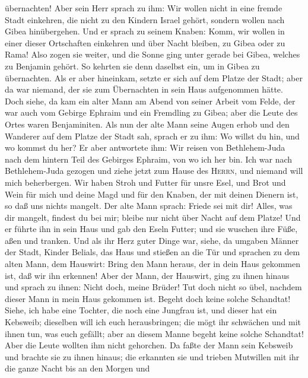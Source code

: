 übernachten!  Aber sein Herr sprach zu ihm: Wir wollen
nicht in eine fremde Stadt einkehren, die nicht zu den Kindern Israel
gehört, sondern wollen nach Gibea hinübergehen.  Und er
sprach zu seinem Knaben: Komm, wir wollen in einer dieser Ortschaften
einkehren und über Nacht bleiben, zu Gibea oder zu Rama! 
Also zogen sie weiter, und die Sonne ging unter gerade bei Gibea,
welches zu Benjamin gehört.  So kehrten sie denn daselbst
ein, um in Gibea zu übernachten. Als er aber hineinkam, setzte er sich
auf dem Platze der Stadt; aber da war niemand, der sie zum Übernachten
in sein Haus aufgenommen hätte.  Doch siehe, da kam ein
alter Mann am Abend von seiner Arbeit vom Felde, der war auch vom
Gebirge Ephraim und ein Fremdling zu Gibea; aber die Leute des Ortes
waren Benjaminiten.  Als nun der alte Mann seine Augen
erhob und den Wanderer auf dem Platze der Stadt sah, sprach er zu ihm:
Wo willst du hin, und wo kommst du her?  Er aber
antwortete ihm: Wir reisen von Bethlehem-Juda nach dem hintern Teil des
Gebirges Ephraim, von wo ich her bin. Ich war nach Bethlehem-Juda
gezogen und ziehe jetzt zum Hause des \textsc{Herrn}, und niemand will
mich beherbergen.  Wir haben Stroh und Futter für unsre
Esel, und Brot und Wein für mich und deine Magd und für den Knaben, der
mit deinen Dienern ist, so daß uns nichts mangelt.  Der
alte Mann sprach: Friede sei mit dir! Alles, was dir mangelt, findest du
bei mir; bleibe nur nicht über Nacht auf dem Platze!  Und
er führte ihn in sein Haus und gab den Eseln Futter; und sie wuschen
ihre Füße, aßen und tranken.  Und als ihr Herz guter
Dinge war, siehe, da umgaben Männer der Stadt, Kinder Belials, das Haus
und stießen an die Tür und sprachen zu dem alten Mann, dem Hauswirt:
Bring den Mann heraus, der in dein Haus gekommen ist, daß wir ihn
erkennen!  Aber der Mann, der Hauswirt, ging zu ihnen
hinaus und sprach zu ihnen: Nicht doch, meine Brüder! Tut doch nicht so
übel, nachdem dieser Mann in mein Haus gekommen ist. Begeht doch keine
solche Schandtat!  Siehe, ich habe eine Tochter, die noch
eine Jungfrau ist, und dieser hat ein Kebsweib; dieselben will ich euch
herausbringen; die mögt ihr schwächen und mit ihnen tun, was euch
gefällt; aber an diesem Manne begeht keine solche Schandtat!
 Aber die Leute wollten ihm nicht gehorchen. Da faßte der
Mann sein Kebsweib und brachte sie zu ihnen hinaus; die erkannten sie
und trieben Mutwillen mit ihr die ganze Nacht bis an den Morgen und
